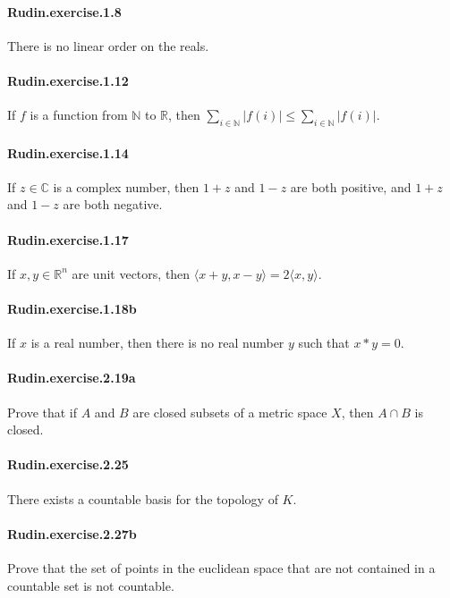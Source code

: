 \documentclass{article}
\begin{document}
\paragraph{Rudin.exercise.1.8} There is no linear order on the reals.

\paragraph{Rudin.exercise.1.12} If $f$ is a function from $\mathbb{N}$ to $\mathbb{R}$, then $\sum_{i\in\mathbb{N}} |f(i)| \leq \sum_{i\in\mathbb{N}} |f(i)|$.

\paragraph{Rudin.exercise.1.14} If $z \in \mathbb{C}$ is a complex number, then $1 + z$ and $1 - z$ are both positive, and $1 + z$ and $1 - z$ are both negative.

\paragraph{Rudin.exercise.1.17} If $x, y \in \mathbb{R}^n$ are unit vectors, then $\langle x + y, x - y \rangle = 2\langle x, y \rangle$.

\paragraph{Rudin.exercise.1.18b} If $x$ is a real number, then there is no real number $y$ such that $x * y = 0$. 

\paragraph{Rudin.exercise.2.19a} Prove that if $A$ and $B$ are closed subsets of a metric space $X$, then $A \cap B$ is closed.

\paragraph{Rudin.exercise.2.25} There exists a countable basis for the topology of $K$.

\paragraph{Rudin.exercise.2.27b} Prove that the set of points in the euclidean space that are not contained in a countable set is not countable.
\end{document}
